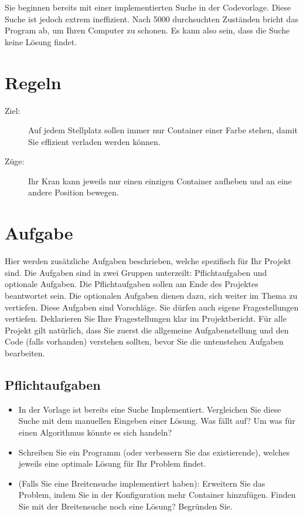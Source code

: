 \documentclass[a4paper,11pt,german,notitlepage]{report}
\begin{document}
Sie beginnen bereits mit einer implementierten Suche in der Codevorlage.
Diese Suche ist jedoch extrem ineffizient.
Nach 5000 durchsuchten Zuständen bricht das Program ab, um Ihren Computer zu schonen.
Es kann also sein, dass die Suche keine Lösung findet.
\section*{Regeln}
\begin{description}
    \item[Ziel:] Auf jedem Stellplatz sollen immer nur Container einer Farbe stehen, damit Sie effizient verladen werden können.
    \item[Züge:] Ihr Kran kann jeweils nur einen einzigen Container aufheben und an eine andere Position bewegen. 
\end{description}

\section*{Aufgabe}
Hier werden zusätzliche Aufgaben beschrieben, welche spezifisch für Ihr Projekt sind.
Die Aufgaben sind in zwei Gruppen unterzeilt: Pflichtaufgaben und optionale Aufgaben.
Die Pflichtaufgaben sollen am Ende des Projektes beantwortet sein.
Die optionalen Aufgaben dienen dazu, sich weiter im Thema zu vertiefen.
Diese Aufgaben sind Vorschläge. Sie dürfen auch eigene Fragestellungen vertiefen.
Deklarieren Sie Ihre Fragestellungen klar im Projektbericht.
Für alle Projekt gilt natürlich, dass Sie zuerst die allgemeine Aufgabenstellung und den Code (falls vorhanden) verstehen sollten, bevor Sie die untenstehen Aufgaben bearbeiten.
\subsection*{Pflichtaufgaben}
\begin{itemize}
    \item In der Vorlage ist bereits eine Suche Implementiert. Vergleichen Sie diese Suche mit dem manuellen Eingeben einer Lösung. Was fällt auf? Um was für einen Algorithmus könnte es sich handeln?
    \item Schreiben Sie ein Programm (oder verbessern Sie das existierende), welches jeweils eine optimale Lösung für Ihr Problem findet.
    \item (Falls Sie eine Breitensuche implementiert haben): Erweitern Sie das Problem, indem Sie in der Konfiguration mehr Container hinzufügen. Finden Sie mit der Breitensuche noch eine Lösung? Begründen Sie.
\end{itemize}
\end{document}

